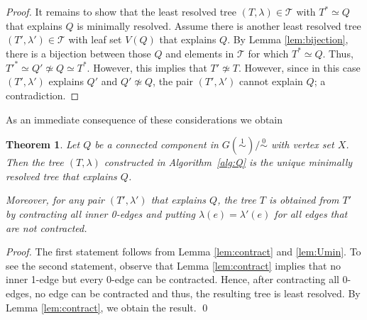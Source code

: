 \documentclass[smallextended]{svjour3}
\newcommand{\rev}[1]{\begingroup\color{blue}#1\endgroup}
\newcommand{\Ro}{\mathrel{\overset{0}{\sim}}}
\newcommand{\Rl}{\mathrel{\overset{1}{\sim}}}
\newtheorem{thm}{Theorem}
\begin{document}
{\begin{proof}
	It remains to show that the least resolved tree $(T,\lambda)\in \mathcal{T}$
	with $T^*\simeq Q$ that explains $Q$ is minimally resolved. 
	Assume there is another 
	least resolved tree $(T',\lambda') \in \mathcal{T}$ with leaf set $V(Q)$
   that explains $Q$. 
	By Lemma \ref{lem:bijection}, there is a bijection between those 
	$Q$ and elements in $\mathcal{T}$ for which  $T^*\simeq Q$. 
	Thus,  $T'^*\simeq Q'\not\simeq Q \simeq T^*$. However, this implies that 
	$T'\not\simeq T$. However, since in this case $(T',\lambda')$ explains $Q'$
	and  $Q'\not\simeq Q$, the pair $(T',\lambda')$ cannot explain $Q$;
	 a contradiction. 
\end{proof}	
}



\rev{As an immediate consequence of these considerations we obtain}
\begin{thm}
  Let $Q$ be a connected component in $G(\Rl)/\Ro$ with vertex set $X$.
  Then the tree $(T,\lambda)$ constructed in Algorithm~\ref{alg:Q} is the unique
  \rev{minimally} resolved tree that explains $Q$. 

\rev{	Moreover, for any pair $(T',\lambda')$ that explains $Q$, 
		the tree $T$ is obtained from $T'$ by contracting
	all \emph{inner} 0-edges and putting $\lambda(e) = \lambda'(e)$
	for all edges that are not contracted. }
  \label{thm:connComp}
\end{thm}
\begin{proof}
\rev{	The first statement follows from Lemma \ref{lem:contract} and \ref{lem:Umin}. 
	To see the second statement, observe that Lemma \ref{lem:contract} implies 
	that no inner 1-edge but every 0-edge can be contracted. 
	Hence, after contracting all 0-edges, no edge can be contracted and thus, 
	the resulting tree is least resolved. By Lemma \ref{lem:contract}, 
	we obtain the result.}
	\qed
\end{proof}
\end{document}
